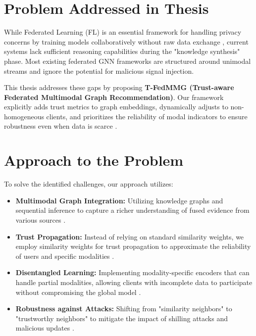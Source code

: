 \documentclass[12pt,a4paper]{report}
\begin{document}
{\section{Problem Addressed in Thesis}
While Federated Learning (FL) is an essential framework for handling privacy concerns by training models collaboratively without raw data exchange \cite{b5}, current systems lack sufficient reasoning capabilities during the "knowledge synthesis" phase. Most existing federated GNN frameworks are structured around unimodal streams and ignore the potential for malicious signal injection.

This thesis addresses these gaps by proposing \textbf{T-FedMMG (Trust-aware Federated Multimodal Graph Recommendation)}. Our framework explicitly adds trust metrics to graph embeddings, dynamically adjusts to non-homogeneous clients, and prioritizes the reliability of modal indicators to ensure robustness even when data is scarce \cite{b1, b5}.

\section{Approach to the Problem}
To solve the identified challenges, our approach utilizes:
\begin{itemize}
    \item \textbf{Multimodal Graph Integration:} Utilizing knowledge graphs and sequential inference to capture a richer understanding of fused evidence from various sources \cite{b5}.
    \item \textbf{Trust Propagation:} Instead of relying on standard similarity weights, we employ similarity weights for trust propagation to approximate the reliability of users and specific modalities \cite{b3, b4}.
    \item \textbf{Disentangled Learning:} Implementing modality-specific encoders that can handle partial modalities, allowing clients with incomplete data to participate without compromising the global model \cite{b6}.
    \item \textbf{Robustness against Attacks:} Shifting from "similarity neighbors" to "trustworthy neighbors" to mitigate the impact of shilling attacks and malicious updates \cite{b4}.
\end{itemize}


}
\end{document}
